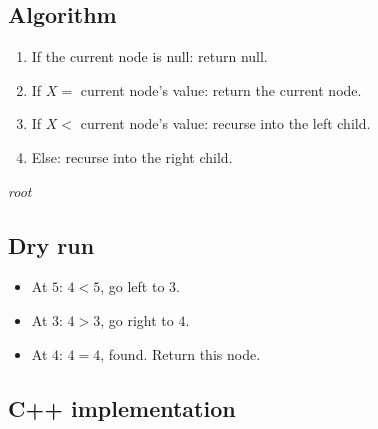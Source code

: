 \subsection*{Algorithm}

\begin{enumerate}
  \item If the current node is null: return null.
  \item If $X =$ current node's value: return the current node.
  \item If $X <$ current node's value: recurse into the left child.
  \item Else: recurse into the right child.
\end{enumerate}

\begin{algorithm}[H]
\caption{Search in a BST}
\begin{algorithmic}[1]
   \Return {} \EndIf
   \Return \textit{root} \EndIf
    \State \Return {}
  \Else
    \State \Return {}
  \EndIf
\EndProcedure
\end{algorithmic}
\end{algorithm}

\subsection*{Dry run}


\begin{itemize}
  \item At $5$: $4<5$, go left to $3$.
  \item At $3$: $4>3$, go right to $4$.
  \item At $4$: $4=4$, found. Return this node.
\end{itemize}

\subsection*{C++ implementation}

